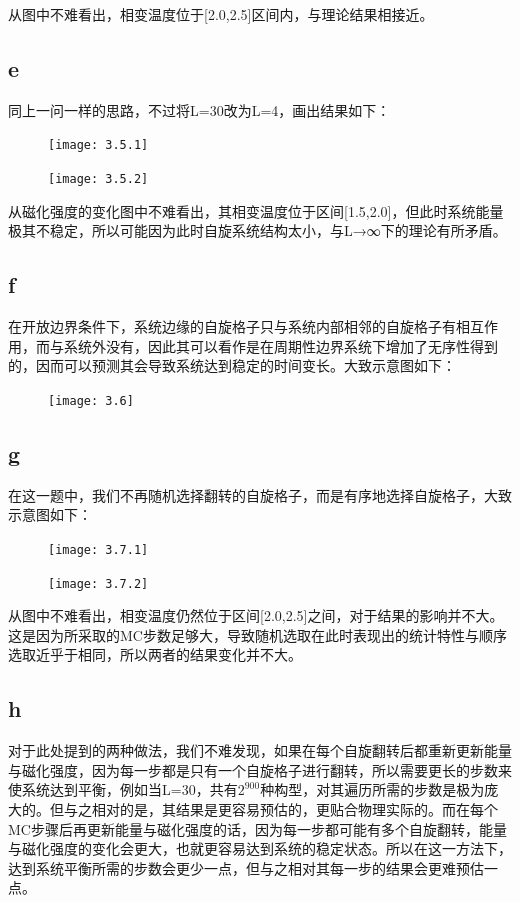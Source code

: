 \documentclass[UTF8]{ctexart}
\begin{document}
    从图中不难看出，相变温度位于[2.0,2.5]区间内，与理论结果相接近。

    \subsection{e}\label{subsec:3.5}
    同上一问一样的思路，不过将L=30改为L=4，画出结果如下：
    \begin{figure}[h]
        \centering
        \texttt{[image: 3.5.1]}
        \label{fig:3.5.1}
    \end{figure}
    \begin{figure}[h]
        \centering
        \texttt{[image: 3.5.2]}
        \label{fig:3.5.2}
    \end{figure}

    从磁化强度的变化图中不难看出，其相变温度位于区间[1.5,2.0]，但此时系统能量极其不稳定，所以可能因为此时自旋系统结构太小，与L→∞下的理论有所矛盾。

    \subsection{f}\label{subsec:3.6}
    在开放边界条件下，系统边缘的自旋格子只与系统内部相邻的自旋格子有相互作用，而与系统外没有，因此其可以看作是在周期性边界系统下增加了无序性得到的，因而可以预测其会导致系统达到稳定的时间变长。大致示意图如下：
    \begin{figure}[h]
        \centering
        \texttt{[image: 3.6]}
        \label{fig:3.6}
    \end{figure}

    \subsection{g}\label{subsec:3.7}
    在这一题中，我们不再随机选择翻转的自旋格子，而是有序地选择自旋格子，大致示意图如下：
    \begin{figure}[h]
        \centering
        \texttt{[image: 3.7.1]}
        \label{fig:3.7.1}
    \end{figure}
    \begin{figure}[h]
        \centering
        \texttt{[image: 3.7.2]}
        \label{fig:3.7.2}
    \end{figure}
    从图中不难看出，相变温度仍然位于区间[2.0,2.5]之间，对于结果的影响并不大。这是因为所采取的MC步数足够大，导致随机选取在此时表现出的统计特性与顺序选取近乎于相同，所以两者的结果变化并不大。

    \subsection{h}\label{subsec:3.8}
    对于此处提到的两种做法，我们不难发现，如果在每个自旋翻转后都重新更新能量与磁化强度，因为每一步都是只有一个自旋格子进行翻转，所以需要更长的步数来使系统达到平衡，例如当L=30，共有\(2^{900}\)种构型，对其遍历所需的步数是极为庞大的。但与之相对的是，其结果是更容易预估的，更贴合物理实际的。而在每个MC步骤后再更新能量与磁化强度的话，因为每一步都可能有多个自旋翻转，能量与磁化强度的变化会更大，也就更容易达到系统的稳定状态。所以在这一方法下，达到系统平衡所需的步数会更少一点，但与之相对其每一步的结果会更难预估一点。
\end{document}
